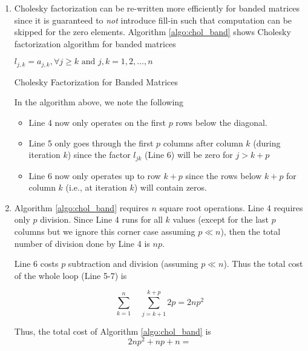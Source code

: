 \begin{enumerate}
\item Cholesky factorization can be re-written more efficiently for banded matrices since it is guaranteed to \emph{not} introduce fill-in such that computation can be skipped for the zero elements. Algorithm \ref{algo:chol_band} shows Cholesky factorization algorithm for banded matrices 

\begin{algorithm}[H]
\SetAlgoLined
{}
 $l_{j,k} = a_{j,k}, \forall j\geq k \text{\ and\ }  j,k= 1,2, \ldots, n$ \\
 \caption{Cholesky Factorization for Banded Matrices}
\label{algo:chol_band}
\end{algorithm}


In the algorithm above, we note the following 
\begin{itemize}
\item Line 4 now only operates on the first $p$ rows below the diagonal.%
\item  Line 5 only goes through the first $p$ columns after column $k$ (during iteration $k$) since the factor $l_{jk}$ (Line 6) will be zero for $j > k+p$
\item Line 6 now only operates up to row $k+p$ since the rows below $k+p$ for column $k$ (i.e., at iteration $k$) will contain zeros. 
\end{itemize}

\newpage
\item Algorithm \ref{algo:chol_band} requires $n$ square root operations. Line 4 requires only $p$ division. Since Line 4 runs for all $k$ values (except for the last $p$ columns but we ignore this corner case assuming $p\ll n$), then the total number of division done by Line 4 is $np$. 

Line 6 costs $p$ subtraction and division (assuming $p\ll n$). Thus the total cost of the whole loop (Line 5-7) is

$$
\sum_{k=1}^{n}\quad \sum_{j=k+1}^{k+p} 2p = 2np^{2}
$$

Thus, the total cost of Algorithm \ref{algo:chol_band} is
$$
2np^{2} + np + n = 
$$

\end{enumerate}